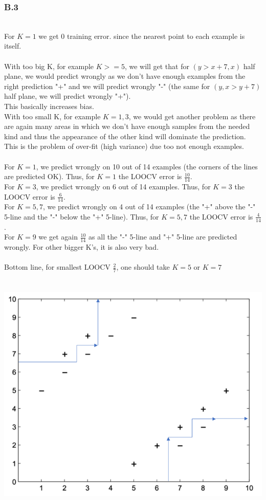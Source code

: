 \documentclass[12pt]{article}
\begin{document}
\subsubsection*{B.3}
\\
For $K=1$ we get 0 training error. since the nearest point to each example is itself.\\
\\
With too big K, for example $K>=5$, we will get that for $(y>x+7,x)$ half plane, we would predict wrongly as we don't have enough examples from the right prediction "+" and we will predict wrongly "-" (the same for $(y,x>y+7)$ half plane, we will predict wrongly "+").\\
This basically increases bias.\\
With too small K, for example $K=1,3$, we would get another problem as there are again many areas in which we don't have enough samples from the needed kind and thus the appearance of the other kind will dominate the prediction.\\
This is the problem of over-fit (high variance) due too not enough examples.\\
\\
For $K=1$, we predict wrongly on 10 out of 14 examples (the corners of the lines are predicted OK). Thus, for $K=1$ the LOOCV error is $\frac{10}{14}$.\\
For $K=3$, we predict wrongly on 6 out of 14 examples. Thus, for $K=3$ the LOOCV error is $\frac{6}{14}$.\\
For $K=5,7$, we predict wrongly on 4 out of 14 examples (the "+" above the "-" 5-line and the "-" below the "+" 5-line). Thus, for $K=5,7$ the LOOCV error is $\frac{4}{14}$.\\
For $K=9$ we get again $\frac{10}{14}$ as all the "-" 5-line and "+" 5-line are predicted wrongly. For other bigger K's, it is also very bad.\\
\\
Bottom line, for smallest LOOCV $\frac{2}{7}$, one should take $K=5$ or $K=7$\\
\\
\\
\includegraphics[scale=0.5]{hw3/plots/q3_answer.PNG}
\newpage
\end{document}
